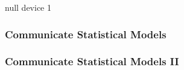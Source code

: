 \documentclass[12pt,handout]{beamer}
\begin{document}
\begin{Schunk}
\begin{Soutput}
null device 
          1 
\end{Soutput}
\end{Schunk}

\begin{frame}
\frametitle{Communicate Statistical Models}
\vspace{.05in}
\begin{center}
\end{center}
\end{frame}




\begin{frame}
\frametitle{Communicate Statistical Models II }
\vspace{.05in}
\begin{center}
\end{center}
\end{frame}
\end{document}
